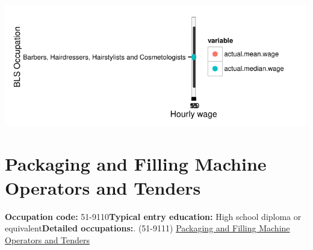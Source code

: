 \documentclass[a4paper,10pt]{article}\usepackage[]{graphicx}\usepackage[]{color}
\makeatletter
\def\maxwidth{ %
  \ifdim\Gin@nat@width>\linewidth
    \linewidth
  \else
    \Gin@nat@width
  \fi
}
\makeatother
\begin{document}
{\centering \includegraphics[width=\maxwidth]{figure/unnamed-chunk-291} 

}


\newpage\section{Packaging and Filling Machine Operators and Tenders}\textbf{Occupation code:} 51-9110\newline\textbf{Typical entry education:} High school diploma or equivalent\newline\textbf{Detailed occupations:}. (51-9111)  \href{http://www.bls.gov/oes/current/oes519111.htm}{Packaging and Filling Machine Operators and Tenders}\newline%
\end{document}
